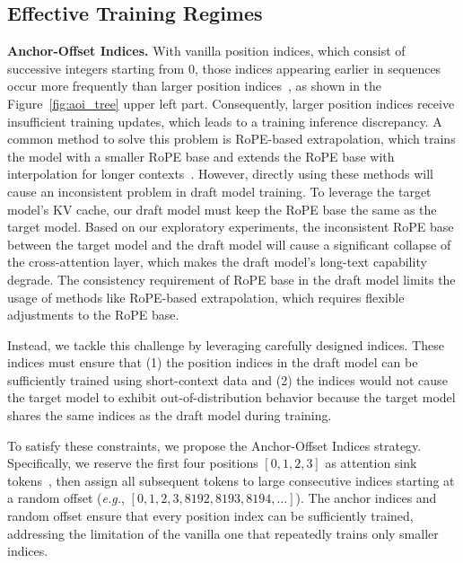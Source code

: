 \subsection{Effective Training Regimes}
\label{subsec: Training}
\textbf{Anchor-Offset Indices.}
With vanilla position indices, which consist of successive integers starting from $0$, those indices appearing earlier in sequences occur more frequently than larger position indices~\cite{an2025does}, as shown in the Figure~\ref{fig:aoi_tree} upper left part.
Consequently, larger position indices receive insufficient training updates, which leads to a training inference discrepancy.
A common method to solve this problem is RoPE-based extrapolation, which trains the model with a smaller RoPE base and extends the RoPE base with interpolation for longer contexts~\cite{gao2024train, liu2024scaling, peng2024yarn}. 
However, directly using these methods will cause an inconsistent problem in draft model training.
To leverage the target model’s KV cache, our draft model must keep the RoPE base the same as the target model.
Based on our exploratory experiments, the inconsistent RoPE base between the target model and the draft model will cause a significant collapse of the cross-attention layer, which makes the draft model's long-text capability degrade.
The consistency requirement of RoPE base in the draft model limits the usage of methods like RoPE-based extrapolation, which requires flexible adjustments to the RoPE base.

Instead, we tackle this challenge by leveraging carefully designed indices. These indices must ensure that (1) the position indices in the draft model can be sufficiently trained using short-context data and (2) the indices would not cause the target model to exhibit out-of-distribution behavior because the target model shares the same indices as the draft model during training.

To satisfy these constraints, we propose the Anchor-Offset Indices strategy.
Specifically, we reserve the first four positions $[0,1,2,3]$ as attention sink tokens~\cite{xiao2024efficient}, then assign all subsequent tokens to large consecutive indices starting at a random offset (\emph{e.g.}, $[0,1,2,3,8192,8193,8194,\dots]$). 
The anchor indices and random offset ensure that every position index can be sufficiently trained, addressing the limitation of the vanilla one that repeatedly trains only smaller indices. 

